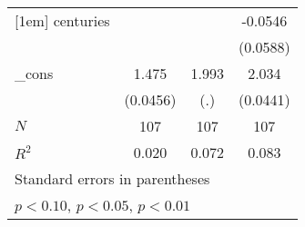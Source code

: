 {\begin{tabular}{l*{3}{c}}
[1em]
centuries   &                     &                     &     -0.0546         \\
            &                     &                     &    (0.0588)         \\
[1em]
\_cons      &       1.475\sym{***}&       1.993         &       2.034\sym{***}\\
            &    (0.0456)         &         (.)         &    (0.0441)         \\
\hline
\(N\)       &         107         &         107         &         107         \\
\(R^{2}\)   &       0.020         &       0.072         &       0.083         \\
\hline\hline
\multicolumn{4}{l}{\footnotesize Standard errors in parentheses}\\
\multicolumn{4}{l}{\footnotesize \sym{*} \(p<0.10\), \sym{**} \(p<0.05\), \sym{***} \(p<0.01\)}\\
\end{tabular}
}
